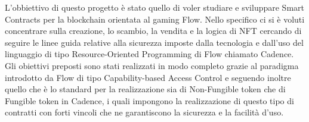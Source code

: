 L'obbiettivo di questo progetto è stato quello di voler studiare e sviluppare Smart Contracts per la blockchain orientata al gaming Flow. Nello specifico ci si è voluti concentrare sulla creazione, lo scambio, la vendita e la logica di NFT cercando di seguire le linee guida relative alla sicurezza imposte dalla tecnologia e dall'uso del linguaggio di tipo Resource-Oriented Programming di Flow chiamato Cadence. Gli obiettivi preposti sono stati realizzati in modo completo grazie al paradigma introdotto da Flow di tipo Capability-based Access Control e seguendo inoltre quello che è lo standard per la realizzazione sia di Non-Fungible token che di Fungible token in Cadence, i quali impongono la realizzazione di questo tipo di contratti con forti vincoli che ne garantiscono la sicurezza e la facilità d'uso.